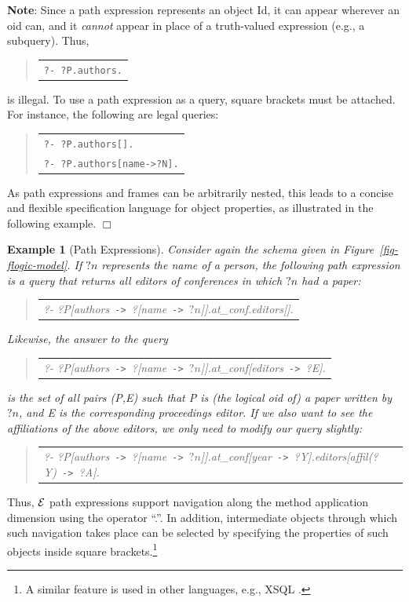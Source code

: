 \documentclass[11pt]{article}
\newcommand{\ERGO}{\mbox{\ensuremath{\cal{E}}\smaller{{\sc{RGO}}}}\xspace}
\newcommand{\FLSYSTEM}{\ERGO}
\newtheorem{example}{Example}[section]
\newenvironment{qrules}{\begin{quote}\tt\begin{tabular}[t]{l}}%
{\end{tabular}\end{quote}}
\newcommand{\mvd}{{\mbox{\tt \,->\,}}}  %
\newcommand{\anon}{?}
\begin{document}
\noindent
{\bf Note}: Since a path expression represents an object Id,
it can appear wherever an oid can, and it \emph{cannot} appear in
place of a truth-valued expression (e.g., a subquery).
Thus,
\begin{qrules}
\tt ?- ?P.authors.
\end{qrules}
is illegal. To use a path expression as a
query, square brackets must be attached. For instance, the following are
legal queries:
\begin{qrules}
   \tt ?- ?P.authors[]. \\
   \tt ?- ?P.authors[name->?N].
\end{qrules}
\noindent
As path expressions and frames can be arbitrarily nested, this leads
to a concise and flexible specification language for object properties, as
illustrated in the following example.
   \hfill$\Box$

\begin{example}[Path Expressions]\label{Ex:PathExpr}
  \rm Consider again the schema given in Figure~\ref{fig-flogic-model}.  If
  $?n$ represents the name of a person, the following path expression is a query
  that returns all editors of conferences in which $?n$ had a paper:
  \begin{qrules}
   ?- ?P[authors\mvd\anon [name\mvd $?n$]].at\_conf.editors[].
  \end{qrules}
  Likewise, the answer to the query
  \begin{qrules}
   ?- ?P[authors\mvd\anon [name\mvd $?n$]].at\_conf[editors\mvd?E].
  \end{qrules}
  is the set of all pairs (\textsf{P},\textsf{E}) such that \textsf{P} is
  (the logical oid of) a paper written by $?n$, and \textsf{E} is the
  corresponding proceedings editor.  If we also want to see the
  affiliations of the above editors, we only need to modify our query
  slightly:
  \begin{qrules}
   ?- ?P[authors\mvd\anon [name\mvd $?n$]].at\_conf[year\mvd ?Y].editors[affil(?Y)\mvd ?A].
  \end{qrules}
\end{example}
Thus, \FLSYSTEM path expressions support navigation 
along the method application dimension using the operator
``.''.
In addition, intermediate objects through which such navigation
takes place can be selected by specifying the properties of such objects
inside square brackets.\footnote{
  A similar feature is used in other languages, e.g., XSQL \cite{xsql-92}.
  }
\end{document}
